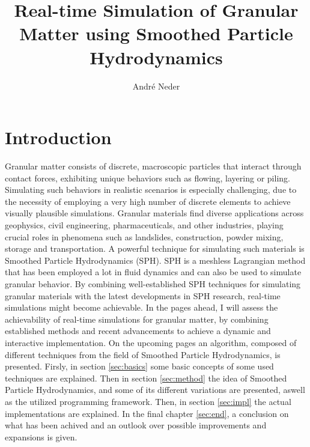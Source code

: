 \documentclass[intern]{cgMA}
\title{Real-time Simulation of Granular Matter using Smoothed Particle Hydrodynamics}
\author{André Neder}
\begin{document}
    \maketitle
    \newpage
    \tableofcontents
    \newpage
    \section{Introduction}

    Granular matter consists of discrete, macroscopic particles that interact through contact forces, exhibiting unique behaviors such as flowing, layering or piling. Simulating such behaviors in realistic scenarios is especially challenging, due to the necessity of employing a very high number of discrete elements to achieve visually plausible simulations. Granular materials find diverse applications across geophysics, civil engineering, pharmaceuticals, and other industries, playing crucial roles in phenomena such as landslides, construction, powder mixing, storage and transportation. A powerful technique for simulating such materials is Smoothed Particle Hydrodynamics (SPH). SPH is a meshless Lagrangian method that has been employed a lot in fluid dynamics and can also be used to simulate granular behavior. By combining well-established SPH techniques for simulating granular materials with the latest developments in SPH research, real-time simulations might become achievable. In the pages ahead, I will assess the achievability of real-time simulations for granular matter, by combining established methods and recent advancements to achieve a dynamic and interactive implementation. On the upcoming pages an algorithm, composed of different techniques from the field of Smoothed Particle Hydrodynamics, is presented. 
    Firsly, in section \ref{sec:basics} some basic concepts of some used techniques are explained. Then in section \ref{sec:method} the idea of Smoothed Particle Hydrodynamics, and some of its different variations are presented, aswell as the utilized programming framework. Then, in section \ref{sec:impl} the actual implementations are explained. In the final chapter \ref{sec:end}, a conclusion on what has been achived and an outlook over possible improvements and expansions is given. %
    \pagebreak
\end{document}
